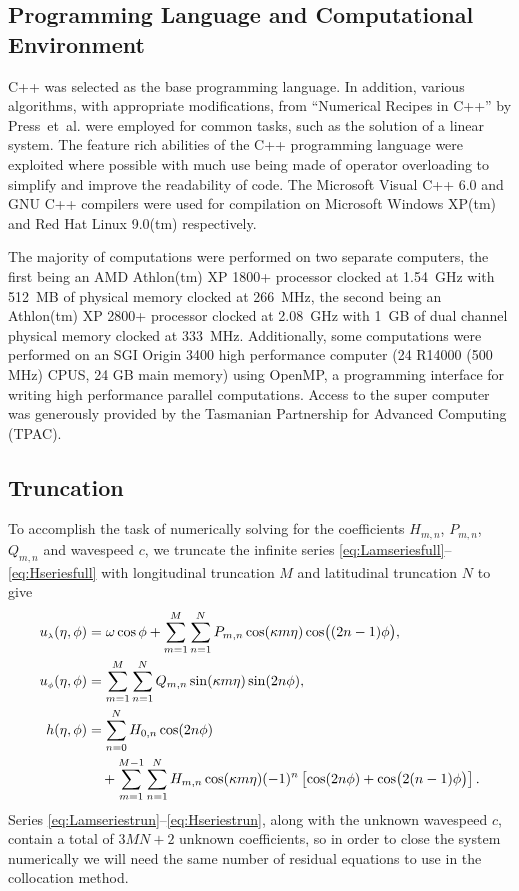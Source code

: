 \subsection{Programming Language and Computational Environment}
\label{subsec:compinfo}
C++ was selected as the base programming language. In addition, various algorithms, with appropriate modifications, from ``Numerical Recipes in C++'' by Press~et~al.\cite{Press:NRC} were employed for common tasks, such as the solution of a linear system. The feature rich abilities of the C++ programming language were exploited where possible with much use being made of operator overloading to simplify and improve the readability of code. The Microsoft Visual C++ 6.0 and GNU C++ compilers were used for compilation on Microsoft Windows XP(tm) and Red Hat Linux 9.0(tm) respectively.

The majority of computations were performed on two separate computers, the first being an AMD Athlon(tm) XP 1800+ processor clocked at 1.54~GHz with 512~MB of physical memory clocked at 266~MHz, the second being an Athlon(tm) XP 2800+ processor clocked at 2.08~GHz with 1~GB of dual channel physical memory clocked at 333~MHz. Additionally, some computations were performed on an SGI Origin 3400 high performance computer (24 R14000 (500 MHz) CPUS, 24 GB main memory) using OpenMP, a programming interface for writing high performance parallel computations. Access to the super computer was generously provided by the Tasmanian Partnership for Advanced Computing (TPAC).

\subsection{Truncation} To accomplish the task of numerically solving for the coefficients $H_{m,n}$, $P_{m,n}$, $Q_{m,n}$ and wavespeed $c$, we truncate the infinite series \eqref{eq:Lamseriesfull}--\eqref{eq:Hseriesfull} with longitudinal truncation $M$ and latitudinal truncation $N$ to give
\begin{align}
{\ensuremath{u_{\scriptscriptstyle \lambda}}}(\eta,\phi) &= \omega\cos\phi+\sum_{m=1}^M \sum_{n=1}^N P_{m,n}\cos(\kappa m \eta) \cos\bigl((2n-1)\phi\bigr), \label{eq:Lamseriestrun}\\
{u_{\scriptscriptstyle \phi}}(\eta,\phi) &= \sum_{m=1}^M \sum_{n=1}^N Q_{m,n}\sin(\kappa m \eta) \sin(2n\phi), \label{eq:Phiseriestrun}\\
h(\eta,\phi) &= \sum_{n=0}^N H_{0,n}\cos(2 n \phi) \notag \\
&\quad+\sum_{m=1}^{M-1} \sum_{n=1}^N H_{m,n} \cos(\kappa m \eta) (-1)^n \left[ \cos(2n\phi)+\cos\bigl(2(n-1)\phi\bigr) \right]. \label{eq:Hseriestrun}
\end{align}
Series \eqref{eq:Lamseriestrun}--\eqref{eq:Hseriestrun}, along with the unknown wavespeed $c$, contain a total of $3MN+2$ unknown coefficients, so in order to close the system numerically we will need the same number of residual equations to use in the collocation method. 

